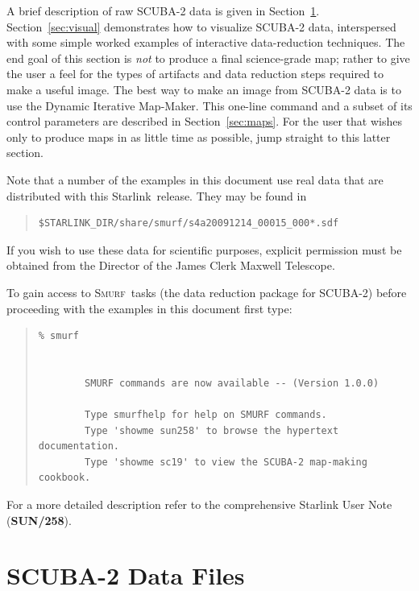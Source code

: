 \documentclass[twoside,11pt]{article}
\newcommand{\htmladdnormallink}[2]{#1}
\newcommand{\xref}[3]{#1}
\newcommand{\xlabel}[1]{}
\renewcommand{\_}{\texttt{\symbol{95}}}
\newenvironment{myquote}{\begin{quote}\begin{small}}{\end{small}\end{quote}}
\newcommand{\starlink}{\htmladdnormallink{Starlink}{http://starlink.jach.hawaii.edu}}
\newcommand{\smurf}{\xref{\textsc{Smurf}}{sun258}{}}
\begin{document}
A brief description of raw SCUBA-2 data is given in
Section~\ref{sec:data}. Section~\ref{sec:visual} demonstrates how to
visualize SCUBA-2 data, interspersed with some simple worked examples
of interactive data-reduction techniques. The end goal of this section
is {\em not} to produce a final science-grade map; rather to give the
user a feel for the types of artifacts and data reduction steps
required to make a useful image. The best way to make an image from
SCUBA-2 data is to use the Dynamic Iterative Map-Maker. This one-line
command and a subset of its control parameters are described in
Section~\ref{sec:maps}. For the user that wishes only to produce maps
in as little time as possible, jump straight to this latter section.

Note that a number of the examples in this document use real data that
are distributed with this \starlink\ release. They may be found in

\begin{myquote}
\begin{verbatim}
$STARLINK_DIR/share/smurf/s4a20091214_00015_000*.sdf
\end{verbatim}
\end{myquote}

If you wish to use these data for scientific purposes, explicit
permission must be obtained from the Director of the James Clerk
Maxwell Telescope.

To gain access to \smurf\ tasks (the data reduction package for
SCUBA-2) before proceeding with the examples in this document first
type:

\begin{myquote}
\begin{verbatim}
% smurf


        SMURF commands are now available -- (Version 1.0.0)

        Type smurfhelp for help on SMURF commands.
        Type 'showme sun258' to browse the hypertext documentation.
        Type 'showme sc19' to view the SCUBA-2 map-making cookbook.

\end{verbatim}
\end{myquote}
%

For a more detailed description refer to the comprehensive Starlink
User Note (\xref{\textbf{SUN/258}}{sun258}{}).


\section{\xlabel{data_files}SCUBA-2 Data Files}
\label{sec:data}
\end{document}

